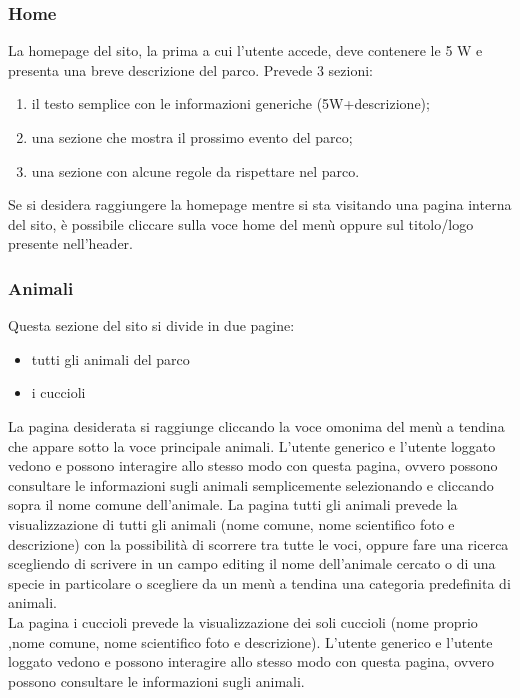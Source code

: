         \subsubsection{Home}
            La homepage del sito, la prima a cui l'utente accede, deve contenere le 5 W e presenta una breve descrizione del parco.
            Prevede 3 sezioni:
            \begin{enumerate}
                \item il testo semplice con le informazioni generiche (5W+descrizione);
                \item una sezione che mostra il prossimo evento del parco;
                \item una sezione con alcune regole da rispettare nel parco.
            \end{enumerate}
            Se si desidera raggiungere la homepage mentre si sta visitando una pagina interna del sito, è possibile cliccare sulla voce home del menù oppure sul titolo/logo presente nell'header.

        \subsubsection{Animali}
            Questa sezione del sito si divide in due pagine:
            \begin{itemize}
                \item tutti gli animali del parco
                \item i cuccioli
            \end{itemize}
            La pagina desiderata si raggiunge cliccando la voce omonima del menù a tendina che appare sotto la voce principale animali. L'utente generico e l'utente loggato vedono e possono interagire allo stesso modo con questa pagina, ovvero possono consultare le informazioni sugli animali semplicemente selezionando e cliccando sopra il nome comune dell'animale.
            La pagina tutti gli animali prevede la visualizzazione di tutti gli animali (nome comune, nome scientifico foto e descrizione) con la possibilità di scorrere tra tutte le voci, oppure fare una ricerca scegliendo di scrivere in un campo editing il nome dell'animale cercato o di una specie in particolare o scegliere da un menù a tendina una categoria predefinita di animali. \\
            La pagina i cuccioli prevede la visualizzazione dei soli cuccioli (nome proprio ,nome comune, nome scientifico foto e descrizione). L'utente generico e l'utente loggato vedono e possono interagire allo stesso modo con questa pagina, ovvero possono consultare le informazioni sugli animali.

